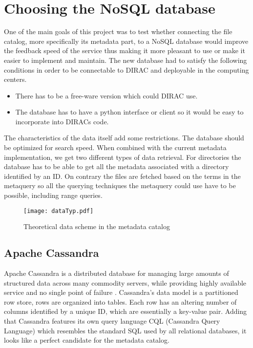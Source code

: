 \chapter{Choosing the NoSQL database}
\label{chap:databases}
One of the main goals of this project was to test whether connecting the 
file catalog, more specifically its metadata part, to a NoSQL database would 
improve the feedback speed of the service thus making it more pleasant to use
or make it easier to implement and maintain. The new database had to satisfy the
following conditions in order to be connectable to DIRAC and deployable in
the computing centers.

\begin{itemize}
\item There has to be a free-ware version which could DIRAC use.
\item The database has to have a python interface or client so it would be easy
to incorporate into DIRACs code.
\end{itemize}

The characteristics of the data itself add some restrictions. The database should be
optimized for search speed. When combined with the current metadata implementation, we
get two different types of data retrieval. For directories 
the database has to be able to get all the metadata associated with a directory
identified by an ID. On contrary the files are fetched based on the terms in the metaquery so
all the querying techniques the metaquery could use have to be possible, including
range queries. 

\begin{figure}[h]
\centering
\texttt{[image: dataTyp.pdf]}
\label{fig:theoDataScheme}
\caption{Theoretical data scheme in the metadata catalog}
\end{figure}


\section{Apache Cassandra}
Apache Cassandra is a distributed database for managing large amounts of structured data 
across many commodity servers, while providing highly available service and no single point 
of failure \cite{cassandra}. Cassandra's data model is a
partitioned row store, rows are organized into tables. Each row
has an altering number of columns identified by a unique ID, which are essentially a
key-value pair. Adding that Cassandra features
its own query language CQL (Cassandra Query Language) which resembles the standard SQL 
used by all relational databases, it looks like a perfect candidate for the metadata catalog.

